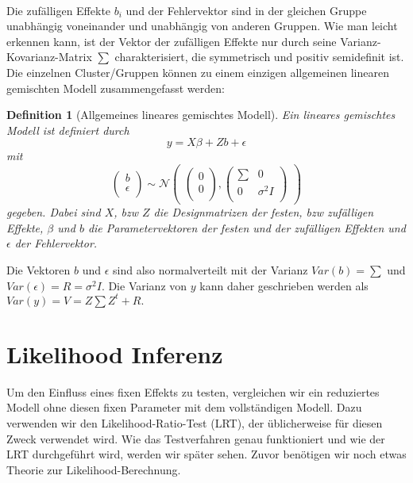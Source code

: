 \documentclass[%
thesis=student,%
coverpage=false,%
titlepage=false,%
headmarks=true, %
german,%
font=libertine, %
math=newpxtx, %
BCOR=5mm,%
coverBCOR=11mm%
]{tumbook}
\theoremstyle{break}
\newtheorem{definition}{Definition}[section]
\begin{document}
\\
Die zufälligen Effekte $b_i$ und der Fehlervektor sind in der gleichen Gruppe unabhängig voneinander und unabhängig von anderen Gruppen. Wie man leicht erkennen kann, ist der Vektor der zufälligen Effekte nur durch seine Varianz-Kovarianz-Matrix $\sum$ charakterisiert, die symmetrisch und positiv semidefinit ist.
\\
Die einzelnen Cluster/Gruppen können zu einem einzigen allgemeinen linearen gemischten Modell zusammengefasst werden:
\begin{definition}[Allgemeines lineares gemischtes Modell]
	Ein lineares gemischtes Modell ist definiert durch
	$$y = X\beta + Zb + \epsilon $$
	mit $$\begin{pmatrix}
		b \\
		\epsilon \\
	\end{pmatrix}
	\sim
	\mathcal{N}
	\begin{pmatrix}
		\begin{pmatrix}
			
			0 \\
			0 \\
		\end{pmatrix},
		\begin{pmatrix}
			\sum & 0 \\
			0 & \sigma^2I \\
		\end{pmatrix}
	\end{pmatrix}$$
	gegeben. Dabei sind $X$, bzw $Z$ die Designmatrizen der festen, bzw zufälligen Effekte, $\beta$ und $b$ die Parametervektoren der festen und der zufälligen Effekten und $\epsilon$ der Fehlervektor.
\end{definition}\noindent
Die Vektoren $b$ und $\epsilon$ sind also normalverteilt mit der Varianz $Var(b) = \sum$ und $Var(\epsilon) = R = \sigma^2I$. Die Varianz von $y$ kann daher geschrieben werden als $Var(y) = V = Z \sum Z^t + R.$
\section{Likelihood Inferenz}
Um den Einfluss eines fixen Effekts zu testen, vergleichen wir ein reduziertes Modell ohne diesen fixen Parameter mit dem vollständigen Modell. Dazu verwenden wir den Likelihood-Ratio-Test (LRT), der üblicherweise für diesen Zweck verwendet wird. Wie das Testverfahren genau funktioniert und wie der LRT durchgeführt wird, werden wir später sehen. Zuvor benötigen wir noch etwas Theorie zur Likelihood-Berechnung. 
\end{document}
